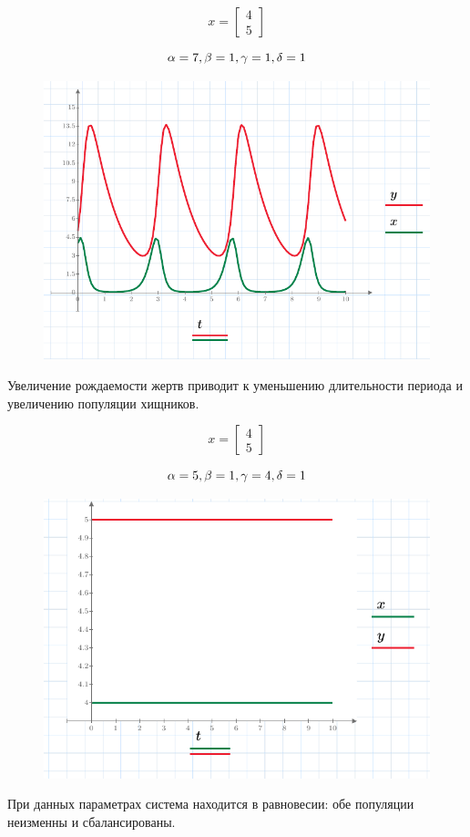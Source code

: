 \documentclass[a4paper, 14pt]{extarticle}
\begin{document}
		\noindent \[ x = \begin{bmatrix}
			4 \\ 5
		\end{bmatrix} \]
		
		\noindent\[
		\alpha = 7,\\
		\beta = 1,\\
		\gamma = 1,\\
		\delta = 1
		\]
		\begin{figure}[H]
			\centering
			\includegraphics[width = \linewidth]{5.pdf}
			\caption[.] {}
		\end{figure}
		Увеличение рождаемости жертв приводит к уменьшению длительности периода и увеличению популяции хищников.
		\pagebreak
		
		\noindent \[ x = \begin{bmatrix}
			4 \\ 5
		\end{bmatrix} \]
		
		\noindent\[
		\alpha = 5,\\
		\beta = 1,\\
		\gamma = 4,\\
		\delta = 1
		\]
		\begin{figure}[H]
			\centering
			\includegraphics[width = \linewidth]{7.pdf}
			\caption[.] {}
		\end{figure}
		При данных параметрах система находится в равновесии: обе популяции неизменны и сбалансированы.
		\pagebreak
		
\end{document}

